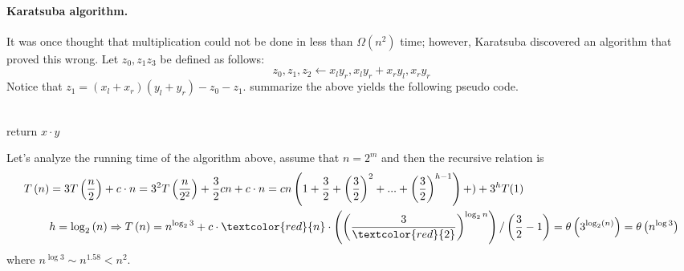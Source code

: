 \paragraph{Karatsuba algorithm.}
It was once thought that multiplication could not be done in less than $\Omega\left(n^2\right)$ time; however, Karatsuba discovered an algorithm \cite{Karatsuba1963MultiplicationOM} that proved this wrong. Let $z_{0},z_{1}z_{3}$ be defined as follows:
\begin{equation*}
z_0, z_1, z_2 \leftarrow x_{l}y_{r}, x_{l}y_{r} + x_{r}y_{l}, x_{r}y_{r}
\end{equation*}Notice that \( z_1 = \left(x_{l}+x_{r}\right)\left(y_{l}+y_{r}\right) - z_{0} -z_{1} \). summarize the above yields the following pseudo code. 

%
\begin{algorithm}
\SetAlgoLined
{}
 \ \\ 
    { return \(x \cdot y\) } 
 \ \\ 
 
\end{algorithm}
%
Let's analyze the running time of the algorithm above, assume that \(n = 2^{m}\) and then the recursive relation is 
\begin{equation*}
    \begin{split}
        T\left(n\right) & = 3T\left(\frac{n}{2}\right) + c\cdot n = 3^2 T\left(\frac{n}{2^2}\right) + \frac{3}{2}cn + c\cdot n = cn\left(1 + \frac{3}{2} + \left(\frac{3}{2}\right)^2 + ...  + \left(\frac{3}{2}\right)^{h-1} \right) + ) + 3^{h}T(1) \\
        & h = \log_{2}\left(n\right) \Rightarrow T\left(n\right) = n^{\log_{2}{3}} +  c\cdot \textcolor{red}{n}\cdot \left(\left(\frac{3}{\textcolor{red}{2}}\right)^{\log_{2}{n}}\right) / \left(\frac{3}{2} - 1\right) = \theta \left( 3^{\log_{2}(n)} \right) =  \theta \left( n^{\log 3} \right)  
    \end{split}
\end{equation*}
where \(n^{\log 3}  \sim n^{1.58} < n^2 \).

